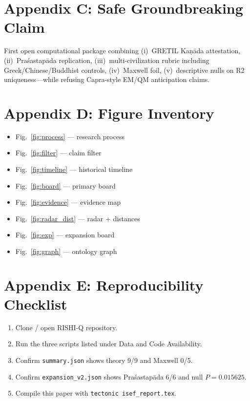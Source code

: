 \documentclass[12pt]{article}
\newcommand{\Kanada}{Kaṇāda}
\newcommand{\Pras}{Praśastapāda}
\begin{document}
\section{Appendix C: Safe Groundbreaking Claim}
\label{app:claim}
\noindent
First open computational package combining (i)~GRETIL \Kanada{} attestation, (ii)~\Pras{} replication, (iii)~multi-civilization rubric including Greek/Chinese/Buddhist controls, (iv)~Maxwell foil, (v)~descriptive nulls on R2 uniqueness---while refusing Capra-style EM/QM anticipation claims.

\section{Appendix D: Figure Inventory}
\label{app:fig}
\begin{itemize}
\item Fig.~\ref{fig:process} --- research process
\item Fig.~\ref{fig:filter} --- claim filter
\item Fig.~\ref{fig:timeline} --- historical timeline
\item Fig.~\ref{fig:board} --- primary board
\item Fig.~\ref{fig:evidence} --- evidence map
\item Fig.~\ref{fig:radar_dist} --- radar + distances
\item Fig.~\ref{fig:exp} --- expansion board
\item Fig.~\ref{fig:graph} --- ontology graph
\end{itemize}

\section{Appendix E: Reproducibility Checklist}
\label{app:repro}
\begin{enumerate}
\item Clone / open RISHI-Q repository.
\item Run the three scripts listed under Data and Code Availability.
\item Confirm \texttt{summary.json} shows theory 9/9 and Maxwell 0/5.
\item Confirm \texttt{expansion\_v2.json} shows \Pras{} 6/6 and null $P=0.015625$.
\item Compile this paper with \texttt{tectonic isef\_report.tex}.
\end{enumerate}
\end{document}
